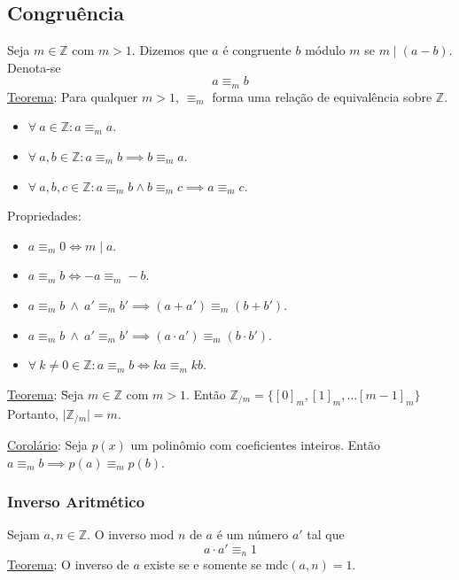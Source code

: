 \documentclass{article}
\begin{document}
\subsection{Congruência}
Seja $m \in \mathbb{Z}$ com $m > 1$. Dizemos que $a$ é congruente $b$ módulo $m$ se $m \mid (a - b)$. Denota-se
\[ a \equiv_m b \]
\uline{Teorema}: Para qualquer $m > 1$, $\equiv_m$ forma uma relação de equivalência sobre $\mathbb{Z}$.
\begin{itemize}
  \item $\forall \: a \in \mathbb{Z}: a \equiv_m a$.
  \item $\forall \: a,b \in \mathbb{Z}: a \equiv_m b \implies b \equiv_m a$.
  \item $\forall \: a,b,c \in \mathbb{Z}: a \equiv_m b \land b \equiv_m c \implies a \equiv_m c$.
\end{itemize}
\vspace{5pt}
Propriedades:
\begin{itemize}
  \item $a \equiv_m 0 \iff m \mid a$.
  \item $a \equiv_m b \iff -a \equiv_m -b$.
  \item $a \equiv_m b \:\land\: a' \equiv_m b' \implies (a + a') \equiv_m (b + b')$.
  \item $a \equiv_m b \:\land\: a' \equiv_m b' \implies (a \cdot a') \equiv_m (b \cdot b')$.
  \item $\forall \: k \neq 0 \in \mathbb{Z}: a \equiv_m b \iff ka \equiv_m kb$.
\end{itemize}
\vspace{-2pt}
\begin{tabbing}
  \uline{Teorema}: \= Seja $m \in \mathbb{Z}$ com $m > 1$. Então $\mathbb{Z}_{/m} = \{ {[0]}_m, {[1]}_m, \hdots {[m - 1]}_m \}$ \\[5pt]
  \> Portanto, $\big| \mathbb{Z}_{/m} \big| = m$.
\end{tabbing}
\uline{Corolário}: Seja $p(x)$ um polinômio com coeficientes inteiros. Então $a \equiv_m b \implies p(a) \equiv_m p(b)$.

\subsubsection{Inverso Aritmético}
Sejam $a, n \in \mathbb{Z}$. O inverso mod $n$ de $a$ é um número $a'$ tal que
\[ a \cdot a' \equiv_n 1 \]
\uline{Teorema}: O inverso de $a$ existe se e somente se $\text{mdc}(a,n) = 1$.
\end{document}
